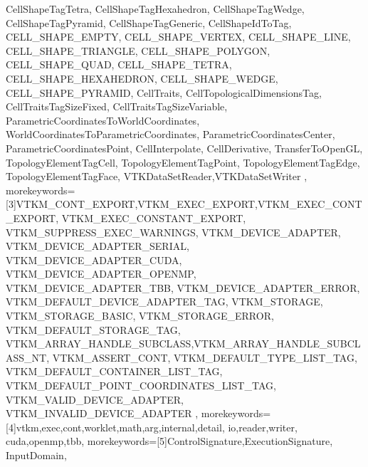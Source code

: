 {{                   CellShapeTagTetra,
                   CellShapeTagHexahedron,
                   CellShapeTagWedge,
                   CellShapeTagPyramid,
                   CellShapeTagGeneric,
                   CellShapeIdToTag,
                   CELL_SHAPE_EMPTY,
                   CELL_SHAPE_VERTEX,
                   CELL_SHAPE_LINE,
                   CELL_SHAPE_TRIANGLE,
                   CELL_SHAPE_POLYGON,
                   CELL_SHAPE_QUAD,
                   CELL_SHAPE_TETRA,
                   CELL_SHAPE_HEXAHEDRON,
                   CELL_SHAPE_WEDGE,
                   CELL_SHAPE_PYRAMID,
                   CellTraits,
                   CellTopologicalDimensionsTag,
                   CellTraitsTagSizeFixed,
                   CellTraitsTagSizeVariable,
                   ParametricCoordinatesToWorldCoordinates,
                   WorldCoordinatesToParametricCoordinates,
                   ParametricCoordinatesCenter,
                   ParametricCoordinatesPoint,
                   CellInterpolate,
                   CellDerivative,
                   TransferToOpenGL,
                   TopologyElementTagCell,
                   TopologyElementTagPoint,
                   TopologyElementTagEdge,
                   TopologyElementTagFace,
                   VTKDataSetReader,VTKDataSetWriter
                   },
  morekeywords={[3]VTKM_CONT_EXPORT,VTKM_EXEC_EXPORT,VTKM_EXEC_CONT_EXPORT,
                   VTKM_EXEC_CONSTANT_EXPORT,
                   VTKM_SUPPRESS_EXEC_WARNINGS,
                   VTKM_DEVICE_ADAPTER,
                   VTKM_DEVICE_ADAPTER_SERIAL,
                   VTKM_DEVICE_ADAPTER_CUDA,
                   VTKM_DEVICE_ADAPTER_OPENMP,
                   VTKM_DEVICE_ADAPTER_TBB,
                   VTKM_DEVICE_ADAPTER_ERROR,
                   VTKM_DEFAULT_DEVICE_ADAPTER_TAG,
                   VTKM_STORAGE,
                   VTKM_STORAGE_BASIC,
                   VTKM_STORAGE_ERROR,
                   VTKM_DEFAULT_STORAGE_TAG,
                   VTKM_ARRAY_HANDLE_SUBCLASS,VTKM_ARRAY_HANDLE_SUBCLASS_NT,
                   VTKM_ASSERT_CONT,
                   VTKM_DEFAULT_TYPE_LIST_TAG,
                   VTKM_DEFAULT_CONTAINER_LIST_TAG,
                   VTKM_DEFAULT_POINT_COORDINATES_LIST_TAG,
                   VTKM_VALID_DEVICE_ADAPTER,
                   VTKM_INVALID_DEVICE_ADAPTER
                   },
  morekeywords={[4]vtkm,exec,cont,worklet,math,arg,internal,detail,
                   io,reader,writer,
                   cuda,openmp,tbb},
  morekeywords={[5]ControlSignature,ExecutionSignature,
                   InputDomain,
}}
